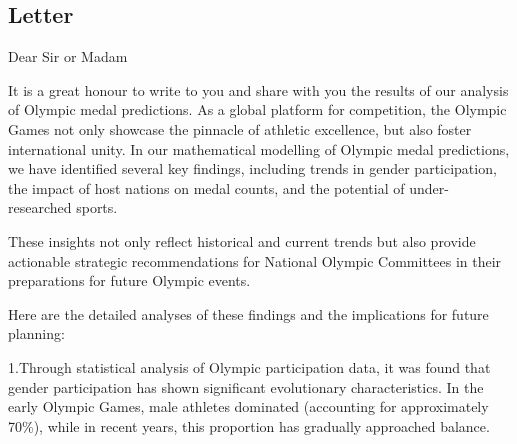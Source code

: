\documentclass{mcmthesis}
\begin{document}
\subsection{Letter}

Dear Sir or Madam

It is a great honour to write to you and share with you the results of our analysis of Olympic medal predictions. As a global platform for competition, the Olympic Games not only showcase the pinnacle of athletic excellence, but also foster international unity. In our mathematical modelling of Olympic medal predictions, we have identified several key findings, including trends in gender participation, the impact of host nations on medal counts, and the potential of under-researched sports.

These insights not only reflect historical and current trends but also provide actionable strategic recommendations for National Olympic Committees in their preparations for future Olympic events. 

Here are the detailed analyses of these findings and the implications for future planning:

1.Through statistical analysis of Olympic participation data, it was found that gender participation has shown significant evolutionary characteristics. In the early Olympic Games, male athletes dominated (accounting for approximately 70\%), while in recent years, this proportion has gradually approached balance.
\end{document}
